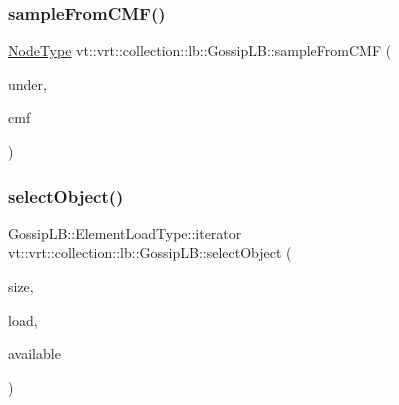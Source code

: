 \subsubsection{\texorpdfstring{sample\+From\+C\+M\+F()}{sampleFromCMF()}}
{\footnotesize\ttfamily \hyperlink{namespacevt_a866da9d0efc19c0a1ce79e9e492f47e2}{Node\+Type} vt\+::vrt\+::collection\+::lb\+::\+Gossip\+L\+B\+::sample\+From\+C\+MF (\begin{DoxyParamCaption}\item[{\hyperlink{structvt_1_1vrt_1_1collection_1_1lb_1_1_gossip_l_b_abb53f1d4bd3c37f3e68c3b5b0e1f1c86}{Node\+Set\+Type} const \&}]{under,  }\item[{std\+::vector$<$ double $>$ const \&}]{cmf }\end{DoxyParamCaption})\hspace{0.3cm}{\ttfamily [protected]}}

\mbox{\label{structvt_1_1vrt_1_1collection_1_1lb_1_1_gossip_l_b_adafa0d7c3295e095149f48c3027b3173}} 
\subsubsection{\texorpdfstring{select\+Object()}{selectObject()}}
{\footnotesize\ttfamily Gossip\+L\+B\+::\+Element\+Load\+Type\+::iterator vt\+::vrt\+::collection\+::lb\+::\+Gossip\+L\+B\+::select\+Object (\begin{DoxyParamCaption}\item[{\hyperlink{structvt_1_1vrt_1_1collection_1_1lb_1_1_base_l_b_a215e22b9f12678303f49615ae3be05cc}{Load\+Type}}]{size,  }\item[{\hyperlink{structvt_1_1vrt_1_1collection_1_1lb_1_1_base_l_b_aa286d31a0820a8fc9218ccb858368fca}{Element\+Load\+Type} \&}]{load,  }\item[{std\+::set$<$ \hyperlink{structvt_1_1vrt_1_1collection_1_1lb_1_1_base_l_b_a790b22acf448880599724749cdc4e9b3}{Obj\+I\+D\+Type} $>$ const \&}]{available }\end{DoxyParamCaption})\hspace{0.3cm}{\ttfamily [protected]}}

\mbox{\label{structvt_1_1vrt_1_1collection_1_1lb_1_1_gossip_l_b_a8ac1a82bee0f81996362076df16c2379}} 
